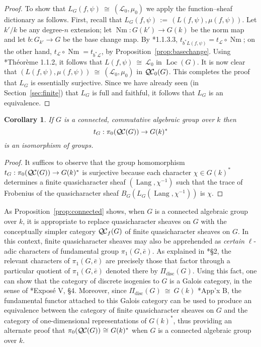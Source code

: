 \documentclass{amsart}
\theoremstyle{plain}
\newtheorem{corollary}[theorem]{Corollary}
\theoremstyle{definition}
\theoremstyle{remark}
\newcommand{\Fq}{k}
\DeclareMathOperator{\Nm}{Nm}
\DeclareMathOperator{\Lang}{Lang}
\DeclareMathOperator{\Loc}{Loc}
\newcommand{\ceq}{{\, :=\, }}
\newcommand{\iso}{{\ \cong\ }}
\newcommand{\qcs}[1]{{\mathcal{#1}}}
\newcommand{\QC}{{\mathcal{Q\hskip-0.8pt C}}}
\newcommand{\QCb}{{\QC_0}}
\newcommand{\QCf}{{\QC_f}}
\newcommand{\QCiso}[1]{\pi_0 (\QC(#1))}
\newcommand{\trFrob}[1]{t_{#1}}
\begin{document}
\begin{proof}
  To show that $L_G(f,\psi) \iso (\qcs{L}_0,\mu_0)$ we apply the function--sheaf dictionary
    as follows.
  First, recall that $L_G(f,\psi) \ceq (L(f,\psi), \mu(f,\psi))$.
  Let $k'/k$ be any degree-$n$ extension; 
  let $\Nm : G(k')\to G(k)$ be the norm map 
  and let $b : G_{k'} \to G$ be the base change map.
  By \cite{laumon:87a}*{1.1.3.3}, 
  $\trFrob{b^*L(f,\psi)} = \trFrob{\qcs{L}} \circ \Nm$;
  on the other hand, $\trFrob{\qcs{L}} \circ \Nm = \trFrob{b^*\qcs{L}}$,
   by Proposition~\ref{prop:basechange}.
  Using \cite{laumon:87a}*{Th\'eor\`eme 1.1.2}, it follows that  $L(f,\psi) \iso \qcs{L}_0$ in $\Loc(G)$.
  It is now clear that $(L(f,\psi),\mu(f,\psi)) \iso (\qcs{L}_0,\mu_0)$ in $\QCb(G)$.
  This completes the proof that $L_G $ is essentially surjective.
  Since we have already seen (in Section~\ref{sec:finite}) that $L_G$ is full and faithful, 
  it follows that $L_G$ is an equivalence.
\end{proof}

\begin{corollary}
 If $G$ is a connected, commutative algebraic group over $\Fq$ then
 \[
  \trFrob{G} : \QCiso{G} \to G(\Fq)^*
 \]
 is an isomorphism of groups.
\end{corollary}
\begin{proof}
 It suffices to observe that the group homomorphism
 $\trFrob{G} : \QCiso{G} \to G(\Fq)^*$
 is surjective because each character $\chi \in G(\Fq)^*$ determines a finite quasicharacter
 sheaf $(\Lang,\chi^{-1})$ such that the trace of Frobenius of the quasicharacter sheaf
 $B_G (L_G(\Lang,\chi^{-1}))$ is $\chi$.
\end{proof}

As Proposition~\ref{prop:connected} shows, 
when $G$ is a connected algebraic group over $\Fq$, 
it is appropriate to replace quasicharacter sheaves on $G$ 
with the conceptually simpler category $\QCf(G)$ of finite quasicharacter sheaves on $G$. 
In this context, finite quasicharacter sheaves may also be apprehended as
\emph{certain} $\ell$-adic characters of fundamental group $\pi_1(G,{\bar e})$. 
As explained in \cite{kamgarpour:09a}*{\S2}, 
the relevant characters of $\pi_1(G,{\bar e})$ are precisely those 
that factor through a particular quotient of $\pi_1(G,{\bar e})$ 
denoted there by $\Pi_\text{disc}(G)$.
Using this fact, one can show that the category of discrete isogenies to $G$ is a Galois category,
in the sense of \cite{grothendieck:SGA1}*{Expos\'e V, \S 4}. 
Moreover, since $\Pi_\text{disc}(G) \iso G(\Fq)$ \cite{kamgarpour:09a}*{App'x B}, 
the fundamental functor attached to this Galois category can be used to produce an equivalence
between the category of finite quasicharacter sheaves on $G$ and
the category of one-dimensional representations of $G(\Fq)^*$, thus
providing an alternate proof that $\QCiso{G} \iso G(\Fq)^*$ 
when $G$ is a connected algebraic group over $\Fq$.
\end{document}

